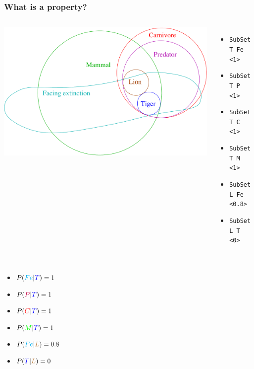 \documentclass{beamer}
\begin{document}
\frame
{
  \frametitle{What is a property?}

  \begin{columns}

    \column{2in}
    
    \includegraphics[scale=0.2]{property_superset.pdf}
    
    \column{2in}
  
    {\footnotesize
      \begin{itemize}
      \item {\tt SubSet {\color{blue}T} {\color{cyan}Fe} <1>}
      \item {\tt SubSet {\color{blue}T} {\color{purple}P} <1>}
      \item {\tt SubSet {\color{blue}T} {\color{red}C} <1>}
      \item {\tt SubSet {\color{blue}T} {\color{green}M} <1>}
      \item {\tt SubSet {\color{brown}L} {\color{cyan}Fe} <0.8>}
      \item {\tt SubSet {\color{brown}L} {\color{blue}T} <0>}
      \end{itemize}
    }
  \end{columns}

   \pause

   \begin{columns}

     \column{1.3in}

     {\footnotesize
     \begin{itemize}
     \item $P({\color{cyan}Fe}|{\color{blue}T})=1$
     \item $P({\color{purple}P}|{\color{blue}T})=1$
     \item $P({\color{red}C}|{\color{blue}T})=1$
     \item $P({\color{green}M}|{\color{blue}T})=1$
     \item $P({\color{cyan}Fe}|{\color{brown}L})=0.8$
     \item $P({\color{blue}T}|{\color{brown}L})=0$
     \end{itemize}
     }


\end{columns}}
\end{document}
